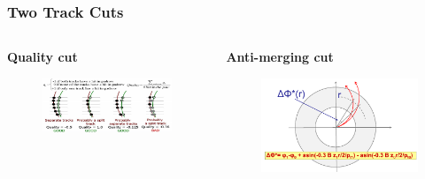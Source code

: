 \documentclass[dvipsnames] {beamer}
\begin{document}
\begin{frame}[shrink=50]
  \bf 
  \frametitle{\bf \centering Two Track Cuts}
  \begin{columns}[c]
    \begin{block}{\bf \centering Quality cut}
      \begin{figure}[H]
        \includegraphics[width=1.\textwidth]{quality.png}
      \end{figure}
    \end{block}
    \begin{block}{\bf \centering Anti-merging cut}
      \begin{figure}[H]
        \includegraphics[width=1.\textwidth]{PhiStar.png}
      \end{figure}
    \end{block}
    

\end{columns}
\end{frame}
\end{document}

